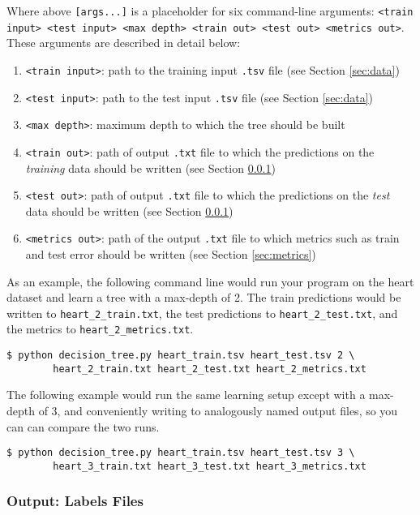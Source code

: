\documentclass[11pt,addpoints,answers]{exam}
\begin{document}
Where above \lstinline{[args...]} is a placeholder for six command-line arguments: 
\texttt{<train input> <test input> <max depth> <train out> <test out> <metrics out>}. These arguments are described in detail below:
\begin{enumerate}
\item \lstinline{<train input>}: path to the training input \lstinline{.tsv} file (see Section \ref{sec:data})
\item \lstinline{<test input>}: path to the test input \lstinline{.tsv} file (see Section \ref{sec:data})
\item \lstinline{<max depth>}: maximum depth to which the tree should be built
\item \lstinline{<train out>}: path of output \lstinline{.txt} file to which the predictions on the \textit{training} data should be written (see Section \ref{sec:labels})
\item \lstinline{<test out>}: path of output \lstinline{.txt} file to which the predictions on the \emph{test} data should be written (see Section \ref{sec:labels})
\item \lstinline{<metrics out>}: path of the output \lstinline{.txt} file to which metrics such as train and test error should be written (see Section \ref{sec:metrics})
\end{enumerate}

As an example, the following command line would run your program on the heart dataset and learn a tree with a max-depth of 2. The train predictions would be written to \lstinline{heart_2_train.txt}, the test predictions to \lstinline{heart_2_test.txt}, and the metrics to \lstinline{heart_2_metrics.txt}.
%
\begin{lstlisting}[language=Shell]
$ python decision_tree.py heart_train.tsv heart_test.tsv 2 \ 
        heart_2_train.txt heart_2_test.txt heart_2_metrics.txt
\end{lstlisting}
%
The following example would run the same learning setup except with a max-depth of 3, and conveniently writing to analogously named output files, so you can can compare the two runs.
%
\begin{lstlisting}[language=Shell]
$ python decision_tree.py heart_train.tsv heart_test.tsv 3 \ 
        heart_3_train.txt heart_3_test.txt heart_3_metrics.txt
\end{lstlisting}

\subsubsection{Output: Labels Files}
\label{sec:labels}
\end{document}
